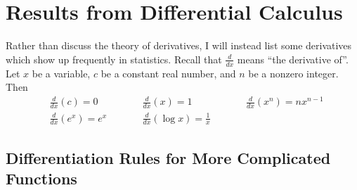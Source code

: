 \section{Results from Differential Calculus}

Rather than discuss the theory of derivatives, I will instead list some derivatives which 
show up frequently in statistics. 
Recall that $\frac{d}{dx}$ means ``the derivative of''. 
Let $x$ be a variable, $c$ be a constant real number, and $n$ be a nonzero integer. Then 
\begin{equation*}
    \begin{aligned}
        &\frac{d}{dx} (c) = 0 & \qquad &\frac{d}{dx} (x) = 1 & \qquad &\frac{d}{dx} \left(x^n\right) = nx^{n-1} \\ 
        &\frac{d}{dx} \left(e^x\right) = e^x & &\frac{d}{dx} \left(\log x\right) = \frac{1}{x} &  &
    \end{aligned}
\end{equation*}

\subsection{Differentiation Rules for More Complicated Functions}

